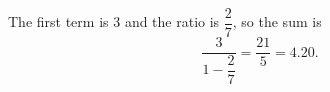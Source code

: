 The first term is $3$ and the ratio is $\dfrac{2}{7}$, so the sum is
\[
\dfrac{3}{1-\dfrac{2}{7}}=\dfrac{21}{5}=\boxed{4.20}.
\]
